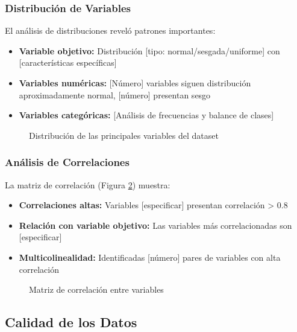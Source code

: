 \subsubsection{Distribución de Variables}

El análisis de distribuciones reveló patrones importantes:

\begin{itemize}
    \item \textbf{Variable objetivo:} Distribución [tipo: normal/sesgada/uniforme] con [características específicas]
    \item \textbf{Variables numéricas:} [Número] variables siguen distribución aproximadamente normal, [número] presentan sesgo
    \item \textbf{Variables categóricas:} [Análisis de frecuencias y balance de clases]
\end{itemize}

\begin{figure}[htbp]
\centering
\caption{Distribución de las principales variables del dataset}
\label{fig:distribucion_variables}
\end{figure}

\subsubsection{Análisis de Correlaciones}

La matriz de correlación (Figura \ref{fig:matriz_correlacion}) muestra:

\begin{itemize}
    \item \textbf{Correlaciones altas:} Variables [especificar] presentan correlación > 0.8
    \item \textbf{Relación con variable objetivo:} Las variables más correlacionadas son [especificar]
    \item \textbf{Multicolinealidad:} Identificadas [número] pares de variables con alta correlación
\end{itemize}

\begin{figure}[htbp]
\centering
\caption{Matriz de correlación entre variables}
\label{fig:matriz_correlacion}
\end{figure}

\subsection{Calidad de los Datos}

